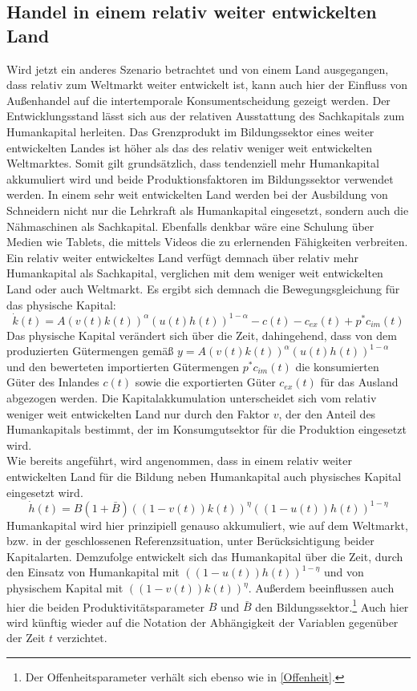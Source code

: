 \subsection{Handel in einem relativ weiter entwickelten Land}
Wird jetzt ein anderes Szenario betrachtet und von einem Land ausgegangen, dass relativ zum Weltmarkt weiter entwickelt ist, kann auch hier der Einfluss von Außenhandel auf die intertemporale Konsumentscheidung gezeigt werden. Der Entwicklungsstand lässt sich aus der relativen Ausstattung des Sachkapitals zum Humankapital herleiten. Das Grenzprodukt im Bildungssektor eines weiter entwickelten Landes ist höher als das des relativ weniger weit entwickelten Weltmarktes. Somit gilt grundsätzlich, dass tendenziell mehr Humankapital akkumuliert wird und beide Produktionsfaktoren im Bildungssektor verwendet werden. In einem sehr weit entwickelten Land werden bei der Ausbildung von Schneidern nicht nur die Lehrkraft als Humankapital eingesetzt, sondern auch die Nähmaschinen als Sachkapital. Ebenfalls denkbar wäre eine Schulung über Medien wie Tablets, die mittels Videos die zu erlernenden Fähigkeiten verbreiten.\\
%
Ein relativ weiter entwickeltes Land verfügt demnach über relativ mehr Humankapital als Sachkapital, verglichen mit dem weniger weit entwickelten Land oder auch Weltmarkt. Es ergibt sich demnach die Bewegungsgleichung für das physische Kapital:
%
\begin{equation}
	\dot{k}(t)=A(v(t)k(t))^\alpha(u(t)h(t))^{1-\alpha}-c(t)-c_{ex}(t)+p^*c_{im}(t)
\end{equation}
%
Das physische Kapital verändert sich über die Zeit, dahingehend, dass von dem produzierten Gütermengen gemäß $y=A(v(t)k(t))^\alpha(u(t)h(t))^{1-\alpha}$ und den bewerteten importierten Gütermengen $p^*c_{im}(t)$ die konsumierten Güter des Inlandes $c(t)$ sowie die exportierten Güter $c_{ex}(t)$ für das Ausland abgezogen werden. Die Kapitalakkumulation unterscheidet sich vom relativ weniger weit entwickelten Land nur durch den Faktor $v$, der den Anteil des Humankapitals bestimmt, der im Konsumgutsektor für die Produktion eingesetzt wird.\\
%
Wie bereits angeführt, wird angenommen, dass in einem relativ weiter entwickelten Land für die Bildung neben Humankapital auch physisches Kapital eingesetzt wird.
%
\begin{equation}
	\dot{h}(t)=B(1+\bar{B})((1-v(t))k(t))^{\eta}((1-u(t))h(t))^{1-\eta}
\end{equation}
%
Humankapital wird hier prinzipiell genauso akkumuliert, wie auf dem Weltmarkt, bzw. in der geschlossenen Referenzsituation, unter Berücksichtigung beider Kapitalarten. Demzufolge entwickelt sich das Humankapital über die Zeit, durch den Einsatz von Humankapital mit $((1-u(t))h(t))^{1-\eta}$ und von physischem Kapital mit $((1-v(t))k(t))^{\eta}$. Außerdem beeinflussen auch hier die beiden Produktivitätsparameter $B$ und $\bar{B}$ den Bildungssektor.\footnote{Der Offenheitsparameter verhält sich ebenso wie in \eqref{Offenheit}.} Auch hier wird künftig wieder auf die Notation der Abhängigkeit der Variablen gegenüber der Zeit $t$ verzichtet.\\
